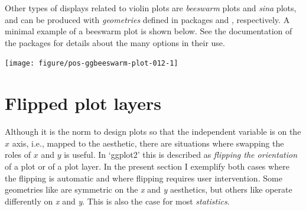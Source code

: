 \documentclass[krantz2]{krantz}\usepackage{knitr}
\begin{document}
Other types of displays related to violin plots are \emph{beeswarm} plots and \emph{sina} plots, and can be produced with \emph{geometries} defined in packages  and , respectively. A minimal example of a beeswarm plot is shown below. See the documentation of the packages for details about the many options in their use.

\begin{knitrout}\footnotesize
{}\color{fgcolor}\begin{kframe}
\begin{alltt}
 \hlkwb{<-}  \hlopt{+} \hlstd{()}
\end{alltt}
\end{kframe}
\end{knitrout}

\begin{knitrout}\footnotesize
{}\color{fgcolor}\begin{kframe}
\begin{alltt}
 \hlopt{+} 
\end{alltt}
\end{kframe}

{\centering \texttt{[image: figure/pos-ggbeeswarm-plot-012-1]} 

}


\end{knitrout}




\section{Flipped plot layers}\label{sec:plot:flipped}

Although it is the norm to design plots so that the independent variable is on the $x$ axis, i.e., mapped to the  aesthetic, there are situations where swapping the roles of $x$ and $y$ is useful. In `ggplot2' this is described as \emph{flipping the orientation} of a plot or of a plot layer. In the present section I exemplify both cases where the flipping is automatic and where flipping requires user intervention. Some geometries like  are symmetric on the \textit{x} and \textit{y} aesthetics, but others like  operate differently on \textit{x} and \textit{y}. This is also the case for most \emph{statistics}.
\end{document}
